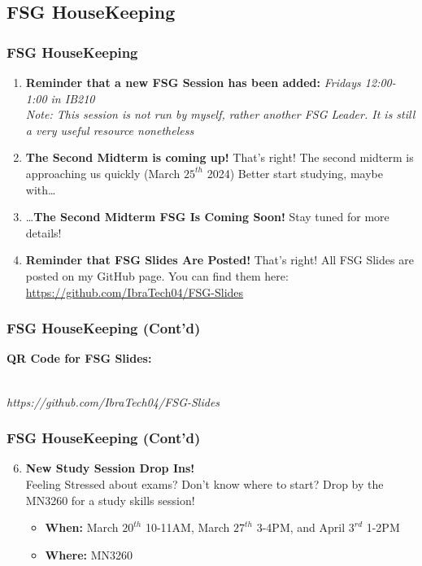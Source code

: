 \documentclass[hyperref={colorlinks,citecolor=blue,linkcolor=blue,urlcolor=blue}, aspectratio=1610]{beamer}
\begin{document}
\subsection{FSG HouseKeeping}
\begin{frame}
  \frametitle{FSG HouseKeeping}
  \begin{enumerate}
    \item \textbf{Reminder that a new FSG Session has been added:}
    \textit{Fridays 12:00-1:00 in IB210}
    \\
    \textit{Note: This session is not run by myself, rather another FSG Leader. It is still a very useful resource nonetheless}
    \item \textbf{The Second Midterm is coming up!} That's right! The second midterm is approaching us quickly (March $25^{th}$ 2024) Better start studying, maybe with\ldots
    \item \ldots\textbf{The Second Midterm FSG Is Coming Soon!} Stay tuned for more details!
    \item \textbf{Reminder that FSG Slides Are Posted!} That's right! All FSG Slides are posted on my GitHub page. You can find them here: \href{https://github.com/IbraTech04/FSG-Slides}{https://github.com/IbraTech04/FSG-Slides}
  \end{enumerate}

\end{frame}

\begin{frame}
  \frametitle{FSG HouseKeeping (Cont'd)}
  \textbf{QR Code for FSG Slides:}
  \begin{center}
     \\
    \textit{https://github.com/IbraTech04/FSG-Slides}
  \end{center}

\end{frame}

\begin{frame}
  \frametitle{FSG HouseKeeping (Cont'd)}
  \begin{enumerate} \setcounter{enumi}{5}
    \item \textbf{New Study Session Drop Ins!} \\ Feeling Stressed about exams? Don't know where to start? Drop by the MN3260 for a study skills session! 
    \begin{itemize}
      \item \textbf{When:} March $20^{th}$ 10-11AM, March $27^{th}$ 3-4PM, and April $3^{rd}$ 1-2PM
      \item \textbf{Where:} MN3260
    \end{itemize}
  \end{enumerate}
\end{frame}
\end{document}
